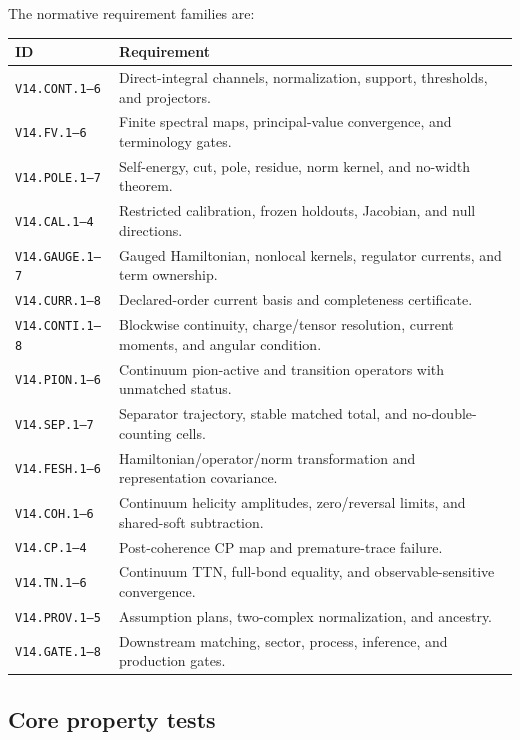 \documentclass[11pt]{article}
\begin{document}
The normative requirement families are:
\begin{longtable}{L{0.20\textwidth}L{0.72\textwidth}}
\toprule
ID & Requirement\\
\midrule
\endhead
\texttt{V14.CONT.1--6} & Direct-integral channels, normalization, support, thresholds, and projectors.\\
\texttt{V14.FV.1--6} & Finite spectral maps, principal-value convergence, and terminology gates.\\
\texttt{V14.POLE.1--7} & Self-energy, cut, pole, residue, norm kernel, and no-width theorem.\\
\texttt{V14.CAL.1--4} & Restricted calibration, frozen holdouts, Jacobian, and null directions.\\
\texttt{V14.GAUGE.1--7} & Gauged Hamiltonian, nonlocal kernels, regulator currents, and term ownership.\\
\texttt{V14.CURR.1--8} & Declared-order current basis and completeness certificate.\\
\texttt{V14.CONTI.1--8} & Blockwise continuity, charge/tensor resolution, current moments, and angular condition.\\
\texttt{V14.PION.1--6} & Continuum pion-active and transition operators with unmatched status.\\
\texttt{V14.SEP.1--7} & Separator trajectory, stable matched total, and no-double-counting cells.\\
\texttt{V14.FESH.1--6} & Hamiltonian/operator/norm transformation and representation covariance.\\
\texttt{V14.COH.1--6} & Continuum helicity amplitudes, zero/reversal limits, and shared-soft subtraction.\\
\texttt{V14.CP.1--4} & Post-coherence CP map and premature-trace failure.\\
\texttt{V14.TN.1--6} & Continuum TTN, full-bond equality, and observable-sensitive convergence.\\
\texttt{V14.PROV.1--5} & Assumption plans, two-complex normalization, and ancestry.\\
\texttt{V14.GATE.1--8} & Downstream matching, sector, process, inference, and production gates.\\
\bottomrule
\end{longtable}

\subsection{Core property tests}
\end{document}
